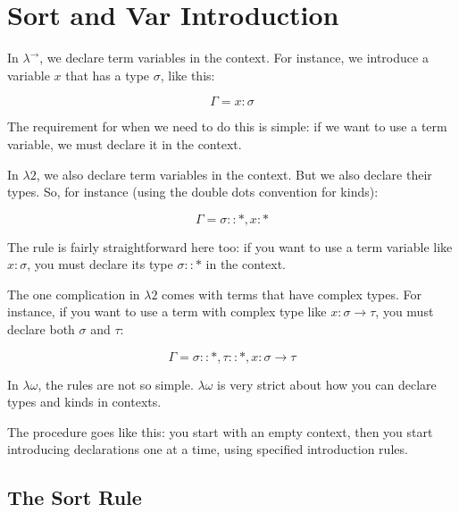 \documentclass{book}
\numberwithin{equation}{chapter}
\begin{document}
\chapter{Sort and Var Introduction}

In $\lambda^{\rightarrow}$, we declare term variables in the context. For instance, we introduce a variable $x$ that has a type $\sigma$, like this:

\begin{equation}
\Gamma = x : \sigma
\end{equation}

\noindent
The requirement for when we need to do this is simple: if we want to use a term variable, we must declare it in the context.

In $\lambda2$, we also declare term variables in the context. But we also declare their types. So, for instance (using the double dots convention for kinds):

\begin{equation}
\Gamma = \sigma :: \ast, x : \ast
\end{equation}

\noindent
The rule is fairly straightforward here too: if you want to use a term variable like $x : \sigma$, you must declare its type $\sigma :: \ast$ in the context. 

The one complication in $\lambda2$ comes with terms that have complex types. For instance, if you want to use a term with complex type like $x : \sigma \rightarrow \tau$, you must declare both $\sigma$ and $\tau$:

\begin{equation}
\Gamma = \sigma :: \ast, \tau :: \ast, x : \sigma \rightarrow \tau
\end{equation}

\noindent
In $\lambda\omega$, the rules are not so simple. $\lambda\omega$ is very strict about how you can declare types and kinds in contexts. 

The procedure goes like this: you start with an empty context, then you start introducing declarations one at a time, using specified introduction rules.


\section{The Sort Rule}
\end{document}
